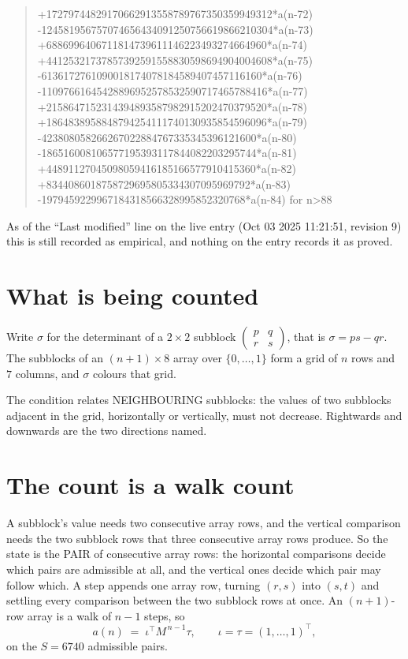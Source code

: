 \documentclass[11pt,a4paper]{article}
\theoremstyle{plain}
\theoremstyle{definition}
\begin{document}
\begin{quote}
+17279744829170662913558789767350359949312*a(n-72) -124581956757074656434091250756619866210304*a(n-73) +6886996406711814739611146223493274664960*a(n-74) +44125321737857392591558830598694904004608*a(n-75) -6136172761090018174078184589407457116160*a(n-76) -11097661645428896952578532590717465788416*a(n-77) +2158647152314394893587982915202470379520*a(n-78) +1864838958848794254111740130935854596096*a(n-79) -423808058266267022884767335345396121600*a(n-80) -186516008106577195393117844082203295744*a(n-81) +44891127045098059416185166577910415360*a(n-82) +8344086018758729695805334307095969792*a(n-83) -1979459229967184318566328995852320768*a(n-84) for n>88
\end{quote}
As of the ``Last modified'' line on the live entry (Oct 03 2025 11:21:51, revision 9) this is still
recorded as empirical, and nothing on the entry records it as proved.

\section{What is being counted}

Write $\sigma$ for the determinant of a $2\times2$ subblock
$\begin{pmatrix}p&q\\r&s\end{pmatrix}$, that is $\sigma=ps-qr$. The subblocks of an
$(n+1)\times8$ array over $\{0,\dots,1\}$ form a grid of $n$ rows and $7$
columns, and $\sigma$ colours that grid.

The condition relates NEIGHBOURING subblocks: the values of two subblocks adjacent in the grid,
horizontally or vertically, must not decrease. Rightwards and downwards are the two directions named.

\section{The count is a walk count}

A subblock's value needs two consecutive array rows, and the vertical
comparison needs the two subblock rows that three consecutive array rows produce. So the state
is the PAIR of consecutive array rows: the horizontal comparisons decide which pairs are
admissible at all, and the vertical ones decide which pair may follow which. A step appends one
array row, turning $(r,s)$ into $(s,t)$ and settling every comparison between the two subblock
rows at once. An $(n+1)$-row array is a walk of $n-1$ steps, so
\[
a(n)\;=\;\iota^{\!\top}M^{\,n-1}\tau,\qquad\iota=\tau=(1,\dots,1)^{\!\top},
\]
on the $S=6740$ admissible pairs.
\end{document}
